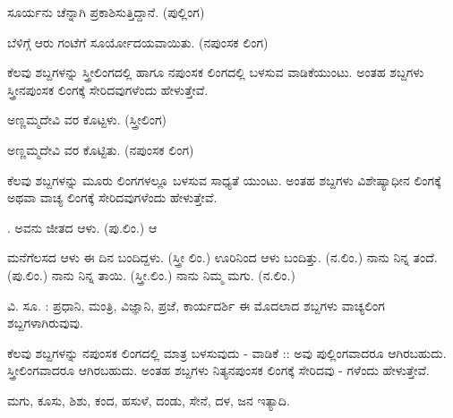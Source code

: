 \noindent\hspace*{1.2em}\hspace{0.6em}ಸೂರ್ಯನು ಚೆನ್ನಾಗಿ ಪ್ರಕಾಶಿಸುತ್ತಿದ್ದಾನೆ. (ಪುಲ್ಲಿಂಗ)\par

\indent ಬೆಳಿಗ್ಗೆ ಆರು ಗಂಟೆಗೆ ಸೂರ್ಯೋದಯವಾಯಿತು. (ನಪುಂಸಕ ಲಿಂಗ)\par

\begin{kbvrule}
\noindent\kbvbullet\hspace{0.5em}ಕೆಲವು ಶಬ್ದಗಳನ್ನು ಸ್ತ್ರೀಲಿಂಗದಲ್ಲಿ ಹಾಗೂ ನಪುಂಸಕ ಲಿಂಗದಲ್ಲಿ ಬಳಸುವ ವಾಡಿಕೆಯುಂಟು. ಅಂತಹ ಶಬ್ದಗಳು ಸ್ತ್ರೀನಪುಂಸಕ ಲಿಂಗಕ್ಕೆ ಸೇರಿದವುಗಳೆಂದು ಹೇಳುತ್ತೇವೆ.
\end{kbvrule}

\noindent\hspace*{1.2em}\hspace{0.6em}ಅಣ್ಣಮ್ಮದೇವಿ ವರ ಕೊಟ್ಟಳು. (ಸ್ತ್ರೀಲಿಂಗ)\par

\begin{kbvrule}
\noindent\kbvbullet\hspace{0.5em}ಅಣ್ಣಮ್ಮದೇವಿ ವರ ಕೊಟ್ಟಿತು. (ನಪುಂಸಕ ಲಿಂಗ)\par
\noindent\kbvbullet\hspace{0.5em}ಕೆಲವು ಶಬ್ದಗಳನ್ನು ಮೂರು ಲಿಂಗಗಳಲ್ಲೂ ಬಳಸುವ ಸಾಧ್ಯತೆ ಯುಂಟು. ಅಂತಹ ಶಬ್ದಗಳು ವಿಶೇಷ್ಯಾಧೀನ ಲಿಂಗಕ್ಕೆ ಅಥವಾ ವಾಚ್ಯ ಲಿಂಗಕ್ಕೆ ಸೇರಿದವುಗಳೆಂದು ಹೇಳುತ್ತೇವೆ.
\end{kbvrule}

\noindent\hspace*{1.2em}\hspace{0.6em}. ಅವನು ಜೀತದ ಆಳು. (ಪು.ಲಿಂ.) ಆ\par

\indent ಮನೆಗೆಲಸದ ಆಳು ಈ ದಿನ ಬಂದಿದ್ದಳು. (ಸ್ತ್ರೀ ಲಿಂ.) ಊರಿನಿಂದ ಆಳು ಬಂದಿತ್ತು. (ನ.ಲಿಂ.) ನಾನು ನಿನ್ನ ತಂದೆ. (ಪು.ಲಿಂ.) ನಾನು ನಿನ್ನ ತಾಯಿ. (ಸ್ತ್ರೀ.ಲಿಂ.) ನಾನು ನಿಮ್ಮ ಮಗು. (ನ.ಲಿಂ.)\par

\indent ವಿ. ಸೂ. : ಪ್ರಧಾನಿ, ಮಂತ್ರಿ, ವಿಜ್ಞಾನಿ, ಪ್ರಜೆ, ಕಾರ್ಯದರ್ಶಿ ಈ ಮೊದಲಾದ ಶಬ್ದಗಳು ವಾಚ್ಯಲಿಂಗ ಶಬ್ದಗಳಾಗಿರುವುವು.\par

\begin{kbvrule}
\noindent\kbvbullet\hspace{0.5em}ಕೆಲವು ಶಬ್ದಗಳನ್ನು ನಪುಂಸಕ ಲಿಂಗದಲ್ಲಿ ಮಾತ್ರ ಬಳಸುವುದು - ವಾಡಿಕೆ :: ಅವು ಪುಲ್ಲಿಂಗವಾದರೂ ಆಗಿರಬಹುದು. ಸ್ತ್ರೀಲಿಂಗವಾದರೂ ಆಗಿರಬಹುದು. ಅಂತಹ ಶಬ್ದಗಳು ನಿತ್ಯನಪುಂಸಕ ಲಿಂಗಕ್ಕೆ ಸೇರಿದವು - ಗಳೆಂದು ಹೇಳುತ್ತೇವೆ.
\end{kbvrule}

\noindent\hspace*{1.2em}\hspace{0.6em}ಮಗು, ಕೂಸು, ಶಿಶು, ಕಂದ, ಹಸುಳೆ, ದಂಡು, ಸೇನೆ, ದಳ, ಜನ ಇತ್ಯಾದಿ. \par
